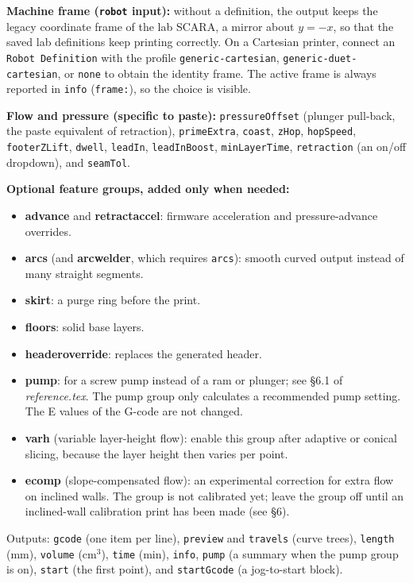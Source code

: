 \documentclass[11pt]{article}
\newcommand{\param}[1]{\texttt{#1}}
\begin{document}
\textbf{Machine frame (\param{robot} input):} without a definition, the
output keeps the legacy coordinate frame of the lab SCARA, a mirror
about $y = -x$, so that the saved lab definitions keep printing
correctly. On a Cartesian printer, connect an \param{Robot
Definition} with the profile \param{generic-cartesian},
\param{generic-duet-cartesian}, or \param{none} to obtain the identity
frame. The active frame is always reported in \param{info}
(\texttt{frame:}), so the choice is visible.

\textbf{Flow and pressure (specific to paste):} \param{pressureOffset}
(plunger pull-back, the paste equivalent of retraction),
\param{primeExtra}, \param{coast}, \param{zHop}, \param{hopSpeed},
\param{footerZLift}, \param{dwell}, \param{leadIn}, \param{leadInBoost},
\param{minLayerTime}, \param{retraction} (an on/off dropdown), and
\param{seamTol}.

\textbf{Optional feature groups, added only when needed:}

\begin{itemize}
  \item \textbf{advance} and \textbf{retractaccel}: firmware acceleration and pressure-advance overrides.
  \item \textbf{arcs} (and \textbf{arcwelder}, which requires \param{arcs}): smooth curved output instead of many straight segments.
  \item \textbf{skirt}: a purge ring before the print.
  \item \textbf{floors}: solid base layers.
  \item \textbf{headeroverride}: replaces the generated header.
  \item \textbf{pump}: for a screw pump instead of a ram or plunger; see \S 6.1 of \emph{reference.tex}. The pump group only calculates a recommended pump setting. The E values of the G-code are not changed.
  \item \textbf{varh} (variable layer-height flow): enable this group after adaptive or conical slicing, because the layer height then varies per point.
  \item \textbf{ecomp} (slope-compensated flow): an experimental correction for extra flow on inclined walls. The group is not calibrated yet; leave the group off until an inclined-wall calibration print has been made (see \S 6).
\end{itemize}

Outputs: \param{gcode} (one item per line), \param{preview} and
\param{travels} (curve trees), \param{length} (mm), \param{volume}
(cm$^3$), \param{time} (min), \param{info}, \param{pump} (a summary
when the pump group is on), \param{start} (the first point), and
\param{startGcode} (a jog-to-start block).
\end{document}
